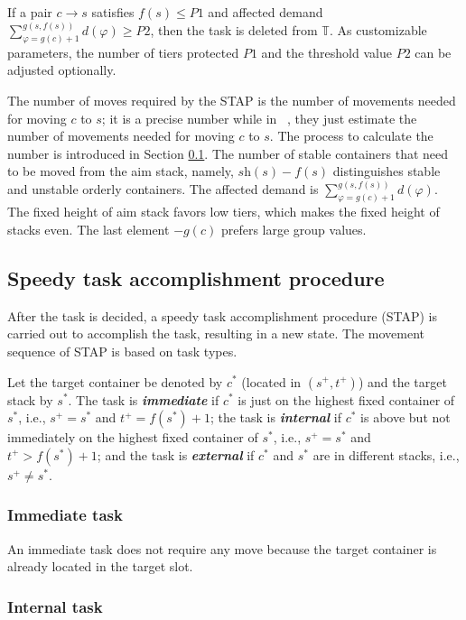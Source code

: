 \documentclass[review,3p,times,12pt,number]{elsarticle}\usepackage{amsmath}\usepackage{amssymb}
\renewcommand{\citet}[1]{\citeauthor{#1}~\citep{#1}}
\renewcommand{\emph}[1]{\textbf{\textit{#1}}}
\begin{document}
If a pair $c\rightarrow s$ satisfies $f(s)\le P1$ and affected demand $\sum_{\varphi=g(c)+1}^{g(s,f(s))}d(\varphi)\ge P2$, then the task is deleted from $\mathbb{T}$. As customizable parameters, the number of tiers protected $P1$ and the threshold value $P2$ can be adjusted optionally.

The number of moves required by the STAP is the number of movements needed for moving $c$ to $s$;
it is a precise number while in \citet{wang2015}, they just estimate the number of movements needed for moving $c$ to $s$.
The process to calculate the number is introduced in Section \ref{sec:speedy}.
The number of stable containers that need to be moved from the aim stack, namely, $\textit{sh}(s)-f(s)$ distinguishes stable and unstable orderly containers.
The affected demand is $\sum_{\varphi=g(c)+1}^{g(s,f(s))}d(\varphi)$.
The fixed height of aim stack favors low tiers, which makes the fixed height of stacks even.
The last element $-g(c)$ prefers large group values.


\subsection{Speedy task accomplishment procedure}

\label{sec:speedy}
After the task is decided, a speedy task accomplishment procedure (STAP) is carried out to accomplish the task, resulting in a new state. The movement sequence of STAP is based on task types.

Let the target container be denoted by $c^*$ (located in $(s^+,t^+)$) and the target stack by $s^*$. The task is \emph{immediate} if $c^*$ is just on the highest fixed container of $s^*$, i.e., $s^+=s^*$ and $t^+=f(s^*)+1$;
the task is \emph{internal} if $c^*$ is above but not immediately on the highest fixed container of $s^*$, i.e., $s^+=s^*$ and $t^+>f(s^*)+1$;
and the task is \emph{external} if $c^*$ and $s^*$ are in different stacks, i.e., $s^+\neq s^*$.


\subsubsection{Immediate task}

An immediate task does not require any move because the target container is already located in the target slot.

\subsubsection{Internal task}
\end{document}

